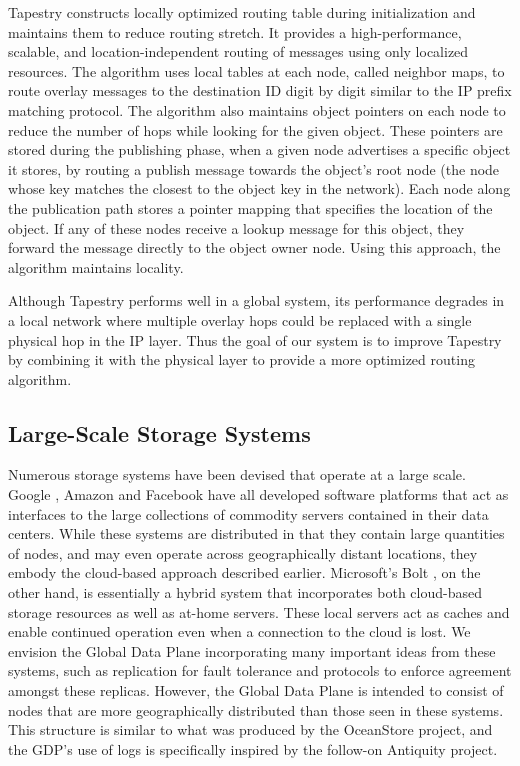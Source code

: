 Tapestry constructs locally optimized routing table during initialization and maintains them to reduce routing stretch.  It provides a high-performance, scalable, and location-independent routing of messages using only localized resources. The algorithm uses local tables at each node, called neighbor maps, to route overlay messages to the destination ID digit by digit similar to the IP prefix matching protocol. The algorithm also maintains object pointers on each node to reduce the number of hops while looking for the given object. These pointers are stored during the publishing phase, when a given node advertises a specific object it stores, by routing a publish message towards the object’s root node (the node whose key matches the closest to the object key in the network). Each node along the publication path stores a pointer mapping that specifies the location of the object. If any of these nodes receive a lookup message for this object, they forward the message directly to the object owner node.  Using this approach, the algorithm maintains locality.

Although Tapestry performs well in a global system, its performance degrades in a local network where multiple overlay hops could be replaced with a single physical hop in the IP layer. Thus the goal of our system is to improve Tapestry by combining it with the physical layer to provide a more optimized routing algorithm.

\subsection{Large-Scale Storage Systems}
Numerous storage systems have been devised that operate at a large scale. Google \cite{bigtable, megastore}, Amazon \cite{dynamo} and Facebook \cite{haystack} have all developed software platforms that act as interfaces to the large collections of commodity servers contained in their data centers. While these systems are distributed in that they contain large quantities of nodes, and may even operate across geographically distant locations, they embody the cloud-based approach described earlier. Microsoft's Bolt \cite{bolt}, on the other hand, is essentially a hybrid system that incorporates both cloud-based storage resources as well as at-home servers. These local servers act as caches and enable continued operation even when a connection to the cloud is lost. We envision the Global Data Plane incorporating many important ideas from these systems, such as replication for fault tolerance and protocols to enforce agreement amongst these replicas. However, the Global Data Plane is intended to consist of nodes that are more geographically distributed than those seen in these systems. This structure is similar to what was produced by the OceanStore \cite{oceanstore} project, and the GDP's use of logs is specifically inspired by the follow-on Antiquity \cite{antiquity} project.

